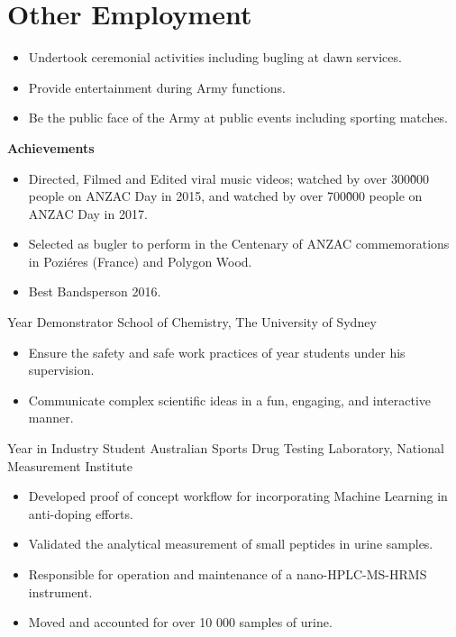 \section{Other Employment}

{}{}
{%
\begin{itemize}
  \item Undertook ceremonial activities including bugling at dawn services.
  \item Provide entertainment during Army functions.
  \item Be the public face of the Army at public events including sporting matches.
\end{itemize}
\textbf{Achievements}
\begin{itemize}
  \item Directed, Filmed and Edited viral music videos; 
     watched by over 300\~000 people on ANZAC Day in 2015, 
    and  watched by over 700\~000 people on ANZAC Day in 2017.
  \item Selected as bugler to perform in the Centenary of ANZAC commemorations in Poziéres (France) and Polygon Wood.
  \item Best Bandsperson 2016.
\end{itemize}
}

\vspace{1em}

{ Year Demonstrator}
{School of Chemistry, The University of Sydney}
{}{}
{%
  \begin{itemize}
    \item Ensure the safety and safe work practices
      of  year students under his supervision.
    \item Communicate complex scientific ideas
      in a fun, engaging, and interactive manner.
  \end{itemize}
}

{Year in Industry Student}
{Australian Sports Drug Testing Laboratory, National Measurement Institute}
{}{}
{%
  \begin{itemize}
    \item Developed proof of concept workflow for incorporating Machine
      Learning in anti-doping efforts.
    \item Validated the analytical measurement of small peptides in urine samples.
    \item Responsible for operation and maintenance of a nano-HPLC-MS-HRMS instrument.
    \item Moved and accounted for over 10 000 samples of urine.
  \end{itemize}
}

